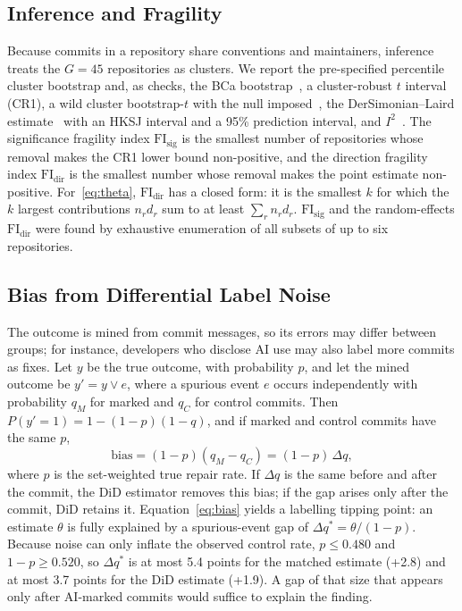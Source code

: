 \documentclass[runningheads]{llncs}
\begin{document}
\subsection{Inference and Fragility}\label{sec:inference}
Because commits in a repository share conventions and maintainers, inference treats the $G = 45$ repositories as clusters. We report the pre-specified percentile cluster bootstrap and, as checks, the BCa bootstrap~\cite{efron1987}, a cluster-robust $t$ interval (CR1), a wild cluster bootstrap-$t$ with the null imposed~\cite{cameron2008}, the DerSimonian--Laird estimate~\cite{dersimonian1986} with an HKSJ interval and a 95\% prediction interval, and $I^2$~\cite{higgins2002}. The significance fragility index $\mathrm{FI}_{\mathrm{sig}}$ is the smallest number of repositories whose removal makes the CR1 lower bound non-positive, and the direction fragility index $\mathrm{FI}_{\mathrm{dir}}$ is the smallest number whose removal makes the point estimate non-positive. For~\eqref{eq:theta}, $\mathrm{FI}_{\mathrm{dir}}$ has a closed form: it is the smallest $k$ for which the $k$ largest contributions $n_r d_r$ sum to at least $\sum_r n_r d_r$. $\mathrm{FI}_{\mathrm{sig}}$ and the random-effects $\mathrm{FI}_{\mathrm{dir}}$ were found by exhaustive enumeration of all subsets of up to six repositories.

\subsection{Bias from Differential Label Noise}\label{sec:bias}
The outcome is mined from commit messages, so its errors may differ between groups; for instance, developers who disclose AI use may also label more commits as fixes. Let $y$ be the true outcome, with probability $p$, and let the mined outcome be $y' = y \lor e$, where a spurious event $e$ occurs independently with probability $q_M$ for marked and $q_C$ for control commits. Then $P(y' = 1) = 1 - (1 - p)(1 - q)$, and if marked and control commits have the same $p$,
\begin{equation}\label{eq:bias}
\text{bias} = (1 - p)(q_M - q_C) = (1 - p)\,\Delta q,
\end{equation}
where $p$ is the set-weighted true repair rate. If $\Delta q$ is the same before and after the commit, the DiD estimator removes this bias; if the gap arises only after the commit, DiD retains it. Equation~\eqref{eq:bias} yields a labelling tipping point: an estimate $\theta$ is fully explained by a spurious-event gap of $\Delta q^{*} = \theta/(1 - p)$. Because noise can only inflate the observed control rate, $p \le 0.480$ and $1 - p \ge 0.520$, so $\Delta q^{*}$ is at most 5.4 points for the matched estimate (+2.8) and at most 3.7 points for the DiD estimate (+1.9). A gap of that size that appears only after AI-marked commits would suffice to explain the finding.
\end{document}
